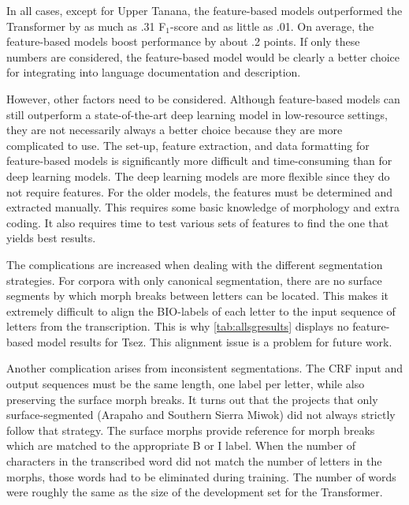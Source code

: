 In all cases, except for Upper Tanana, the feature-based models outperformed the Transformer by as much as .31 F$_1$-score and as little as .01. On average, the feature-based models boost performance by about .2 points. If only these numbers are considered, the feature-based model would be clearly a better choice for integrating into language documentation and description. 

However, other factors need to be considered. Although feature-based models can still outperform a state-of-the-art deep learning model in low-resource settings, they are not necessarily always a better choice because they are more complicated to use. The set-up, feature extraction, and data formatting for feature-based models is significantly more difficult and time-consuming than for deep learning models. The deep learning models are more flexible since they do not require features. For the older models, the features must be determined and extracted manually. This requires some basic knowledge of morphology and extra coding. It also requires time to test various sets of features to find the one that yields best results. 


The complications are increased when dealing with the different segmentation strategies. For corpora with only canonical segmentation, there are no surface segments by which morph breaks between letters can be located. This makes it extremely difficult to align the BIO-labels of each letter to the input sequence of letters from the transcription. This is why \autoref{tab:allsgresults} displays no feature-based model results for Tsez. This alignment issue is a problem for future work. 

Another complication arises from inconsistent segmentations. The CRF input and output sequences must be the same length, one label per letter, while also preserving the surface morph breaks. It turns out that the projects that only surface-segmented (Arapaho and Southern Sierra Miwok) did not always strictly follow that strategy. The surface morphs provide reference for morph breaks which are matched to the appropriate B or I label. When the number of characters in the transcribed word did not match the number of letters in the morphs, those words had to be eliminated during training. The number of words were roughly the same as the size of the development set for the Transformer.


